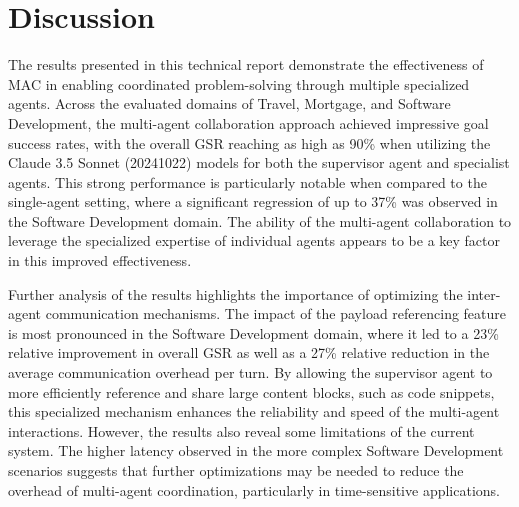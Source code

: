 \section{Discussion}
\label{sec:discussion}

The results presented in this technical report demonstrate the effectiveness of MAC in enabling coordinated problem-solving through multiple specialized agents. Across the evaluated domains of Travel, Mortgage, and Software Development, the multi-agent collaboration approach achieved impressive goal success rates, with the overall GSR reaching as high as 90\% when utilizing the Claude 3.5 Sonnet (20241022) models for both the supervisor agent and specialist agents.
This strong performance is particularly notable when compared to the single-agent setting, where a significant regression of up to 37\% was observed in the Software Development domain. The ability of the multi-agent collaboration to leverage the specialized expertise of individual agents appears to be a key factor in this improved effectiveness.

Further analysis of the results highlights the importance of optimizing the inter-agent communication mechanisms. The impact of the payload referencing feature is most pronounced in the Software Development domain, where it led to a 23\% relative improvement in overall GSR as well as a 27\% relative reduction in the average communication overhead per turn. By allowing the supervisor agent to more efficiently reference and share large content blocks, such as code snippets, this specialized mechanism enhances the reliability and speed of the multi-agent interactions.
However, the results also reveal some limitations of the current system. The higher latency observed in the more complex Software Development scenarios suggests that further optimizations may be needed to reduce the overhead of multi-agent coordination, particularly in time-sensitive applications. 
